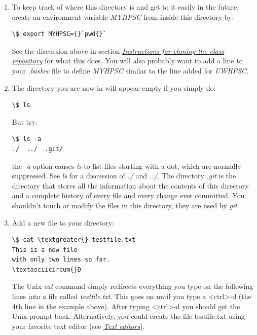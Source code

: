 \documentclass[letterpaper,10pt,english]{sphinxmanual}
\begin{document}
\begin{enumerate}
\item {} 
To keep track of where this directory is and get to it easily in the
future, create an environment variable \emph{MYHPSC} from inside this directory
by:

\begin{Verbatim}[commandchars=\\\{\}]
\$ export MYHPSC={}`pwd{}`
\end{Verbatim}

See the discussion above in section {\hyperref[git:classgit]{\emph{Instructions for cloning the class repository}}} for what this does.  You
will also probably want to add a line to your \emph{.bashrc} file to define
\emph{MYHPSC} similar to the line added for \emph{UWHPSC}.

\item {} 
The directory you are now in will appear empty if you simply do:

\begin{Verbatim}[commandchars=\\\{\}]
\$ ls
\end{Verbatim}

But try:

\begin{Verbatim}[commandchars=\\\{\}]
\$ ls -a
./  ../  .git/
\end{Verbatim}

the \emph{-a} option causes \emph{ls} to list files starting with a dot, which are
normally suppressed.  See \emph{ls} for a discussion of \emph{./} and \emph{../}.
The directory \emph{.git} is the directory that stores all the information
about the contents of this directory and a complete history of every file
and every change ever committed.  You shouldn't touch or modify the files in
this directory, they are used by \emph{git}.

\item {} 
Add a new file to your directory:

\begin{Verbatim}[commandchars=\\\{\}]
\$ cat \textgreater{} testfile.txt
This is a new file
with only two lines so far.
\textasciicircum{}D
\end{Verbatim}

The Unix \emph{cat} command simply redirects everything you type on the
following lines into a file called \emph{testfile.txt}.  This goes on until
you type a \textless{}ctrl\textgreater{}-d (the 4th line in the example
above).  After typing \textless{}ctrl\textgreater{}-d you should get the Unix
prompt back.  Alternatively, you could create the file testfile.txt using
your favorite text editor (see {\hyperref[editors:editors]{\emph{Text editors}}}).


\end{enumerate}
\end{document}
